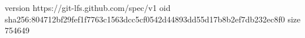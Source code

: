 version https://git-lfs.github.com/spec/v1
oid sha256:804712bf29fef1f7763c1563dcc5cf0542d44893dd55d17b8b2ef7db232ec8f0
size 754649
